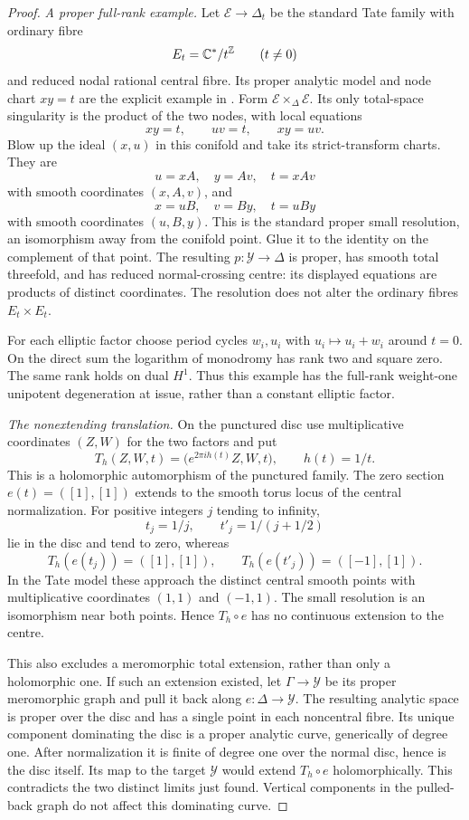 \begin{proof}
\emph{A proper full-rank example.}
Let $\mathcal E\to\Delta_t$ be the standard Tate
family with ordinary fibre
\[
 E_t=\mathbb C^*/t^{\mathbb Z}\qquad(t\ne0)
\]
and reduced nodal rational central fibre. Its
proper analytic model and node chart $xy=t$
are the explicit example in
\citet[Sections 1.1.1--1.1.3, pp.~73--74]{KKN2008Root}.
Form $\mathcal E\times_{\Delta}\mathcal E$.
Its only total-space singularity is the product
of the two nodes, with local equations
\[
 xy=t,\qquad uv=t,\qquad xy=uv.
\]
Blow up the ideal $(x,u)$ in this conifold and
take its strict-transform charts. They are
\[
 u=xA,\quad y=Av,\quad t=xAv
\]
with smooth coordinates $(x,A,v)$, and
\[
 x=uB,\quad v=By,\quad t=uBy
\]
with smooth coordinates $(u,B,y)$. This is the
standard proper small resolution, an isomorphism
away from the conifold point. Glue it to the
identity on the complement of that point. The
resulting $p:\mathcal Y\to\Delta$ is proper,
has smooth total threefold, and has reduced
normal-crossing centre: its displayed equations
are products of distinct coordinates. The
resolution does not alter the ordinary fibres
$E_t\times E_t$.

For each elliptic factor choose period cycles
$w_i,u_i$ with $u_i\mapsto u_i+w_i$ around
$t=0$. On the direct sum the logarithm of
monodromy has rank two and square zero.
The same rank holds on dual $H^1$. Thus this
example has the full-rank weight-one
unipotent degeneration at issue, rather than
a constant elliptic factor.

\emph{The nonextending translation.}
On the punctured disc use multiplicative
coordinates $(Z,W)$ for the two factors and put
\[
 T_h(Z,W,t)=\bigl(e^{2\pi i h(t)}Z,W,t\bigr),
 \qquad h(t)=1/t.
 \tag{B.4.29.1}
\]
This is a holomorphic automorphism of the
punctured family. The zero section
$e(t)=([1],[1])$ extends to the smooth torus
locus of the central normalization. For
positive integers $j$ tending to infinity,
\[
 t_j=1/j,\qquad t'_j=1/(j+1/2)
\]
lie in the disc and tend to zero, whereas
\[
 T_h(e(t_j))=([1],[1]),\qquad
 T_h(e(t'_j))=([-1],[1]).
\]
In the Tate model these approach the distinct
central smooth points with multiplicative
coordinates $(1,1)$ and $(-1,1)$.
The small resolution is an isomorphism near
both points. Hence $T_h\circ e$ has no
continuous extension to the centre.

This also excludes a meromorphic total
extension, rather than only a holomorphic
one. If such an extension existed, let
$\Gamma\to\mathcal Y$ be its proper
meromorphic graph and pull it back along
$e:\Delta\to\mathcal Y$. The resulting
analytic space is proper over the disc and
has a single point in each noncentral fibre.
Its unique component dominating the disc
is a proper analytic curve, generically of
degree one. After normalization it is finite
of degree one over the normal disc, hence
is the disc itself. Its map to the target
$\mathcal Y$ would extend $T_h\circ e$
holomorphically. This contradicts the two
distinct limits just found. Vertical
components in the pulled-back graph do
not affect this dominating curve.


\end{proof}
